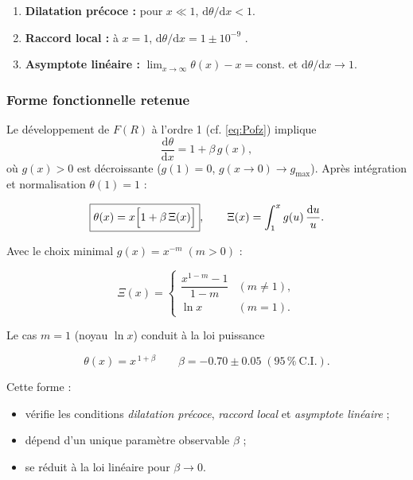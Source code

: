 \documentclass[11pt]{article}
\begin{document}
\begin{enumerate}[label=\roman*)]
  \item \textbf{Dilatation précoce :}
        pour \(x\ll1\), \(\mathrm d\theta/\mathrm d x < 1\).
  \item \textbf{Raccord local :}
        à \(x=1\), \(\mathrm d\theta/\mathrm d x = 1 \pm 10^{-9}\)
        \parencite{Delva2019,Ashby2019}.
  \item \textbf{Asymptote linéaire :}
        \(\displaystyle\lim_{x\to\infty}\theta(x)-x = \text{const.}\) et
        \(\mathrm d\theta/\mathrm d x \to 1\).
\end{enumerate}

\subsubsection{Forme fonctionnelle retenue}

Le développement de \(F(R)\) à l’ordre 1
(cf. \eqref{eq:Pofz}) implique
\[
\frac{\mathrm d\theta}{\mathrm d x}
= 1 + \beta\,g(x),
\]
où \(g(x)\!>\!0\) est décroissante
(\(g(1)=0\), \(g(x\to0)\to g_{\max}\)).
Après intégration et normalisation \(\theta(1)=1\) :

\[
\boxed{%
  \theta(x)=x\Bigl[1+\beta\,\Xi(x)\Bigr]},
\qquad
\Xi(x)=\int_{1}^{x} g(u)\,\frac{\mathrm d u}{u}.
\]

Avec le choix minimal \(g(x)=x^{-m}\;(m>0)\) :

\[
\Xi(x)=
\begin{cases}
\dfrac{x^{1-m}-1}{1-m} & (m\neq1),\\[6pt]
\ln x & (m=1).
\end{cases}
\]

Le cas \(m=1\) (noyau \(\ln x\)) conduit à la loi puissance

\begin{equation}
\label{eq:powerLaw}
\boxed{\theta(x)=x^{\,1+\beta}}
\qquad
\beta = -0.70 \pm 0.05\;(95\,\%\ \text{C.I.}).
\end{equation}

Cette forme :

\begin{itemize}
  \item vérifie les conditions \emph{dilatation précoce},
        \emph{raccord local} et \emph{asymptote linéaire} ;
  \item dépend d’un unique paramètre observable \(\beta\) ;
  \item se réduit à la loi linéaire pour \(\beta\to0\).
\end{itemize}
\end{document}
